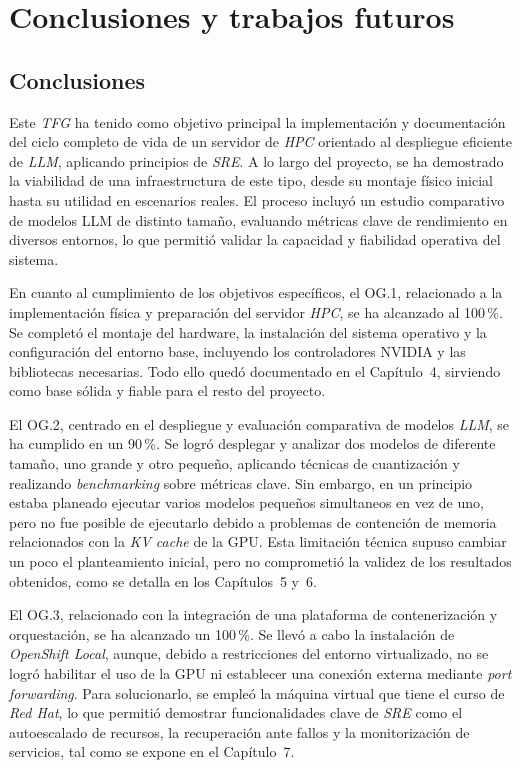 \chapter{Conclusiones y trabajos futuros}

\section{Conclusiones}

Este \textit{TFG} ha tenido como objetivo principal la implementación y documentación del ciclo completo de vida de un servidor de \textit{HPC} orientado al despliegue eficiente de \textit{LLM}, aplicando principios de \textit{SRE}. A lo largo del proyecto, se ha demostrado la viabilidad de una infraestructura de este tipo, desde su montaje físico inicial hasta su utilidad en escenarios reales. El proceso incluyó un estudio comparativo de modelos LLM de distinto tamaño, evaluando métricas clave de rendimiento en diversos entornos, lo que permitió validar la capacidad y fiabilidad operativa del sistema.

En cuanto al cumplimiento de los objetivos específicos, el OG.1, relacionado a la implementación física y preparación del servidor \textit{HPC}, se ha alcanzado al 100\,\%. Se completó el montaje del hardware, la instalación del sistema operativo y la configuración del entorno base, incluyendo los controladores NVIDIA y las bibliotecas necesarias. Todo ello quedó documentado en el Capítulo~4, sirviendo como base sólida y fiable para el resto del proyecto.

El OG.2, centrado en el despliegue y evaluación comparativa de modelos \textit{LLM}, se ha cumplido en un 90\,\%. Se logró desplegar y analizar dos modelos de diferente tamaño, uno grande y otro pequeño, aplicando técnicas de cuantización y realizando \textit{benchmarking} sobre métricas clave. Sin embargo, en un principio estaba planeado ejecutar varios modelos pequeños simultaneos en vez de uno, pero no fue posible de ejecutarlo debido a problemas de contención de memoria relacionados con la \textit{KV cache} de la GPU. Esta limitación técnica supuso cambiar un poco el planteamiento inicial, pero no comprometió la validez de los resultados obtenidos, como se detalla en los Capítulos~5 y~6.

El OG.3, relacionado con la integración de una plataforma de contenerización y orquestación, se ha alcanzado un 100\,\%. Se llevó a cabo la instalación de \textit{OpenShift Local}, aunque, debido a restricciones del entorno virtualizado, no se logró habilitar el uso de la GPU ni establecer una conexión externa mediante \textit{port forwarding}. Para solucionarlo, se empleó la máquina virtual que tiene el curso de \textit{Red Hat}, lo que permitió demostrar funcionalidades clave de \textit{SRE} como el autoescalado de recursos, la recuperación ante fallos y la monitorización de servicios, tal como se expone en el Capítulo~7.

